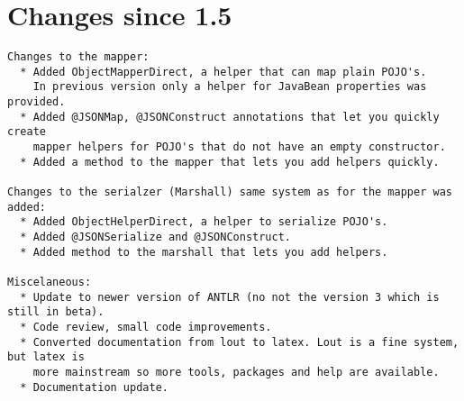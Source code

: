\documentclass[a4paper]{article}
\begin{document}
\section{Changes since 1.5}
\begin{verbatim}
Changes to the mapper:
  * Added ObjectMapperDirect, a helper that can map plain POJO's. 
    In previous version only a helper for JavaBean properties was provided.
  * Added @JSONMap, @JSONConstruct annotations that let you quickly create 
    mapper helpers for POJO's that do not have an empty constructor.
  * Added a method to the mapper that lets you add helpers quickly.

Changes to the serialzer (Marshall) same system as for the mapper was added:
  * Added ObjectHelperDirect, a helper to serialize POJO's. 
  * Added @JSONSerialize and @JSONConstruct.
  * Added method to the marshall that lets you add helpers.

Miscelaneous:
  * Update to newer version of ANTLR (no not the version 3 which is still in beta).
  * Code review, small code improvements.
  * Converted documentation from lout to latex. Lout is a fine system, but latex is
    more mainstream so more tools, packages and help are available.
  * Documentation update.
\end{verbatim}
 
\end{document}
